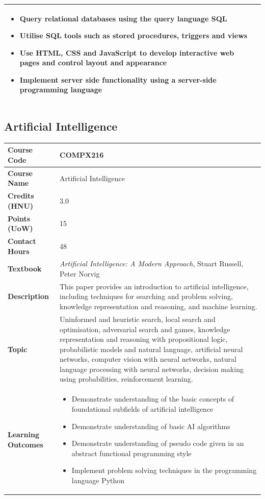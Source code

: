 \documentclass{article}
\begin{document}
\begin{longtable}{|p{3cm}|p{10cm}|}
\begin{itemize}
        \item Query relational databases using the query language SQL
        \item Utilise SQL tools such as stored procedures, triggers and views
        \item Use HTML, CSS and JavaScript to develop interactive web pages and control layout and appearance
        \item Implement server side functionality using a server-side programming language
    \end{itemize} \\
\hline
\end{longtable}

\subsection[COMPX216 Artificial Intelligence]{Artificial Intelligence}
\renewcommand{\arraystretch}{1.5} %
\begin{longtable}{|p{3cm}|p{10cm}|}
\hline
\textbf{Course Code} & COMPX216 \\
\hline
\textbf{Course Name} & Artificial Intelligence \\
\hline
\textbf{Credits (HNU)} & 3.0 \\
\hline
\textbf{Points (UoW)} & 15 \\
\hline
\textbf{Contact Hours} & 48 \\
\hline
\textbf{Textbook} & \emph{Artificial Intelligence: A Modern Approach}, Stuart Russell, Peter Norvig\\
\hline
\textbf{Description} & This paper provides an introduction to artificial intelligence, including techniques for searching and problem solving, knowledge representation and reasoning, and machine learning.\\
\hline
\textbf{Topic} & Uninformed and heuristic search, 
local search and optimisation, 
adversarial search and games, 
knowledge representation and reasoning with propositional logic, 
probabilistic models and natural language, 
artificial neural networks, 
computer vision with neural networks, 
natural language processing with neural networks, 
decision making using probabilities, 
reinforcement learning.\\
\hline
\textbf{Learning Outcomes} & 
    \begin{itemize}
        \item Demonstrate understanding of the basic concepts of foundational subfields of artificial intelligence
        \item Demonstrate understanding of basic AI algorithms
        \item Demonstrate understanding of pseudo code given in an abstract functional programming style
        \item Implement problem solving techniques in the programming language Python
    \end{itemize} \\
\hline
\end{longtable}
\end{document}
